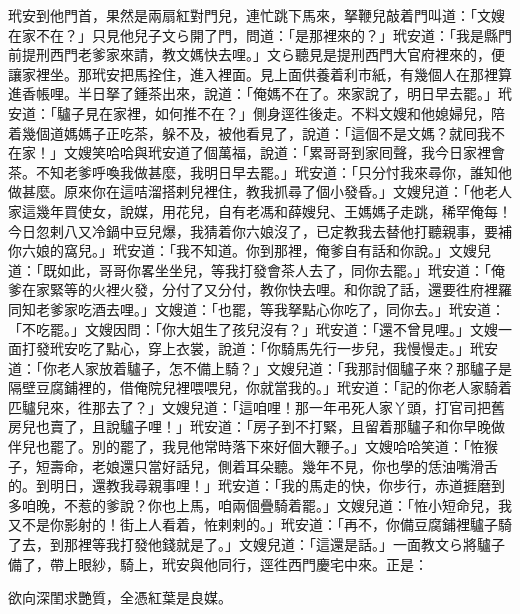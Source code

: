 玳安到他門首，果然是兩扇紅對門兒，連忙跳下馬來，拏鞭兒敲着門叫道：「文嫂在家不在？」只見他兒子文ら開了門，問道：「是那裡來的？」玳安道：「我是縣門前提刑西門老爹家來請，教文媽快去哩。」文ら聽見是提刑西門大官府裡來的，便讓家裡坐。那玳安把馬拴住，進入裡面。見上面供養着利市紙，有幾個人在那裡算進香帳哩。半日拏了鍾茶出來，說道：「俺媽不在了。來家說了，明日早去罷。」玳安道：「驢子見在家裡，如何推不在？」{}側身逕徃後走。不料文嫂和他媳婦兒，陪着幾個道媽媽子正吃茶，躲不及，被他看見了，說道：「這個不是文媽？就囘我不在家！」文嫂笑哈哈與玳安道了個萬福，說道：「累哥哥到家囘聲，我今日家裡會茶。不知老爹呼喚我做甚麼，我明日早去罷。」玳安道：「只分忖我來尋你，誰知他做甚麼。原來你在這咭溜搭剌兒裡住，教我抓尋了個小發昏。」文嫂兒道：「他老人家這幾年買使女，說媒，用花兒，自有老馮和薛嫂兒、王媽媽子走跳，稀罕俺每！今日忽剌八又冷鍋中豆兒爆，{}我猜着你六娘沒了，已定教我去替他打聽親事，要補你六娘的窩兒。」玳安道：「我不知道。你到那裡，俺爹自有話和你說。」文嫂兒道：「既如此，哥哥你畧坐坐兒，等我打發會茶人去了，同你去罷。」玳安道：「俺爹在家緊等的火裡火發，分付了又分付，教你快去哩。和你說了話，還要徃府裡羅同知老爹家吃酒去哩。」文嫂道：「也罷，等我拏點心你吃了，同你去。」玳安道：「不吃罷。」文嫂因問：「你大姐生了孩兒沒有？」玳安道：「還不曾見哩。」文嫂一面打發玳安吃了點心，穿上衣裳，說道：「你騎馬先行一步兒，我慢慢走。」玳安道：「你老人家放着驢子，怎不備上騎？」文嫂兒道：「我那討個驢子來？那驢子是隔壁豆腐鋪裡的，借俺院兒裡喂喂兒，你就當我的。」玳安道：「記的你老人家騎着匹驢兒來，徃那去了？」文嫂兒道：「這咱哩！那一年弔死人家丫頭，打官司把舊房兒也賣了，且說驢子哩！」玳安道：「房子到不打緊，且留着那驢子和你早晚做伴兒也罷了。別的罷了，我見他常時落下來好個大鞭子。」{}文嫂哈哈笑道：「恠猴子，短壽命，老娘還只當好話兒，側着耳朵聽。幾年不見，你也學的恁油嘴滑舌的。到明日，還教我尋親事哩！」玳安道：「我的馬走的快，你步行，赤道捱磨到多咱晚，不惹的爹說？你也上馬，咱兩個疊騎着罷。」文嫂兒道：「恠小短命兒，我又不是你影射的！街上人看着，恠剌剌的。」玳安道：「再不，你備豆腐鋪裡驢子騎了去，到那裡等我打發他錢就是了。」文嫂兒道：「這還是話。」一面教文ら將驢子備了，帶上眼紗，騎上，玳安與他同行，逕徃西門慶宅中來。正是：

\begin{myquote} 
欲向深閨求艷質，全憑紅葉是良媒。
\end{myquote} 

